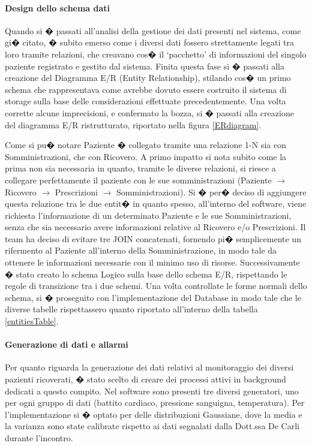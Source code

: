 \documentclass[final, smallexted]{svjour3}
\begin{document}
 \paragraph{\textbf{Design dello schema dati}} Quando si � passati all'analisi della gestione dei dati presenti nel sistema, come gi� citato, � subito emerso come i diversi dati fossero strettamente legati tra loro tramite relazioni, che creavano cos� il `pacchetto' di informazioni del singolo paziente registrato e gestito dal sistema. Finita questa fase si � passati alla creazione del Diagramma E/R (Entity Relationship), stilando cos� un primo schema che rappresentava come avrebbe dovuto essere costruito il sistema di storage sulla base delle considerazioni effettuate precedentemente. Una volta corrette alcune imprecisioni, e confermato la bozza, si � passati alla creazione del diagramma E/R ristrutturato, riportato nella figura \ref{ERdiagram}.
 
 Come si pu� notare Paziente � collegato tramite una relazione 1-N sia con Somministrazioni, che con Ricovero. A primo impatto si nota subito come la prima non sia necessaria in quanto, tramite le diverse relazioni, si riesce a collegare perfettamente il paziente con le sue somministrazioni (Paziente $\rightarrow$ Ricovero $\rightarrow$ Prescrizioni $\rightarrow$ Somministrazioni). Si � per� deciso di aggiungere questa relazione tra le due entit� in quanto spesso, all'interno del software, viene richiesta l'informazione di un determinato Paziente e le sue Somministrazioni, senza che sia necessario avere informazioni relative al Ricovero e/o Prescrizioni. Il team ha deciso di evitare tre JOIN concatenati, fornendo pi� semplicemente un rifermento al Paziente all'interno della Somministrazione, in modo tale da ottenere le informazioni necessarie con il minimo uso di risorse.
 Successivamente � stato creato lo schema Logico sulla base dello schema E/R, rispettando le regole di transizione tra i due schemi. Una volta controllate le forme normali dello schema, si � proseguito con l'implementazione del Database in modo tale che le diverse tabelle rispettassero quanto riportato all'interno della tabella \ref{entitiesTable}.
 
 \paragraph{\textbf{Generazione di dati e allarmi}} Per quanto riguarda la generazione dei dati relativi al monitoraggio dei diversi pazienti ricoverati, � stato scelto di creare dei processi attivi in background dedicati a questo compito. Nel software sono presenti tre diversi generatori, uno per ogni gruppo di dati (battito cardiaco, pressione sanguigna, temperatura). Per l'implementazione si � optato per delle distribuzioni Gaussiane, dove la media e la varianza sono state calibrate rispetto ai dati segnalati dalla Dott.ssa De Carli durante l'incontro.
 
\end{document}
